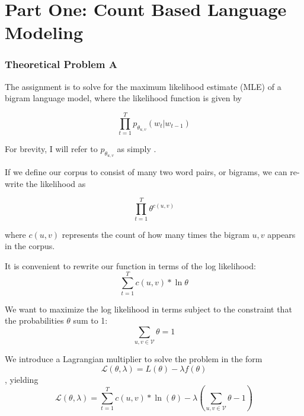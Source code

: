 \chapter*{Part One: Count Based Language Modeling}





\subsection*{Theoretical Problem A}
The assignment is to solve for the maximum likelihood estimate (MLE) of a bigram language model, where the likelihood function is given by

\begin{equation*}
    \prod_{t=1}^{T} p_{\theta_{u,v}}(w_t | w_{t-1})
\end{equation*}

For brevity, I will refer to  $p_{\theta_{u,v}}$ as simply \theta. 

If we define our corpus to consist of many two word pairs, or bigrams, we can re-write the likelihood as

\begin{equation*}
    \prod_{t=1}^{T} \theta^{c(u,v)}
\end{equation*}

where $c(u,v)$ represents the count of how many times the bigram $u,v$ appears in the corpus.

It is convenient to rewrite our function in terms of the log likelihood:
\begin{equation*}
    \sum_{t=1}^{T} c(u,v) * \ln{\theta}
\end{equation*}

We want to maximize the log likelihood in terms subject to the constraint that the probabilities $\theta$ sum to 1:
\begin{equation*}
    \sum_{u,v\in \mathcal{V}} \theta = 1
\end{equation*}

We introduce a Lagrangian multiplier to solve the problem in the form 
\begin{equation*}
    \mathcal{L}(\theta,\lambda) = L(\theta) - \lambda f(\theta)
\end{equation*},
yielding
\begin{equation*}
    \mathcal{L}(\theta,\lambda) = \sum_{t=1}^{T} c(u,v) * \ln(\theta) - \lambda (\sum_{u,v\in \mathcal{V}}\theta -1)
\end{equation*}

